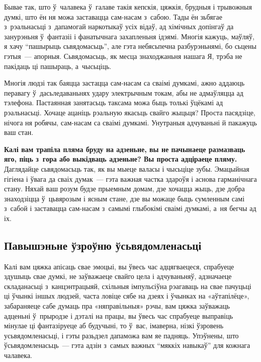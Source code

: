 Бывае так, што ў~чалавека ў~галаве такія кепскія, цяжкія, брудныя і трывожныя думкі, што ён ня можа заставацца сам-насам з~сабою. Тады ён зьбягае з~рэальнасьці з~дапамогай наркотыкаў усіх відаў, ад хімічных допінгаў да занурэньня ў~фантазіі і фанатычнага захапленьня ідэямі. Многія кажуць, маўляў, я хачу ``пашырыць сьвядомасьць'', але гэта небясьпечна разбурэньнямі, бо сьцены гэтыя~--- апорныя. Сьвядомасьць, як месца знаходжаньня нашага Я, трэба не пакідаць ці пашыраць, а~чысьціць.

Многія людзі так баяцца застацца сам-насам са сваімі думкамі, ажно аддаюць перавагу ў~дасьледаваньнях удару электрычным токам, абы не адмаўляцца ад тэлефона. Пастаянная занятасьць таксама можа быць толькі ўцёкамі ад рэальнасьці. Хочаце ацаніць рэальную якасьць свайго жыцьця? Проста пасядзіце, нічога ня робячы, сам-насам са сваімі думкамі. Унутраныя адчуваньні й пакажуць ваш стан.

\textbf{Калі вам трапіла пляма бруду на адзеньне, вы не пачынаеце размазваць яго, піць з~гора або выкідваць адзеньне? Вы проста адціраеце пляму.} Даглядайце сьвядомасьць так, як вы мыеце валасы і чысьціце зубы. Эмацыйная гігіена і ўвага да сваіх думак~--- гэта важная частка здароўя і аснова гарманічнага стану. Няхай ваш розум будзе прыемным домам, дзе хочацца жыць, дзе добра знаходзіцца ў~цьвярозым і ясным стане, дзе вы можаце быць сумленным самі з~сабой і заставацца сам-насам з~самымі глыбокімі сваімі думкамі, а~ня бегчы ад іх.

\subsection*{Павышэньне ўзроўню ўсьвядомленасьці}

Калі вам цяжка апісаць свае эмоцыі, вы ўвесь час адцягваецеся, спрабуеце здушыць свае думкі, не заўважаеце свайго цела і адчуваньняў, адзначаеце складанасьці з~канцэнтрацыяй, схільныя імпульсіўна рэагаваць на свае пачуцьці ці ўчынкі іншых людзей, часта ловіце сябе на дзеях і ўчынках на «аўтапілёце», забараняеце сабе думаць пра «няправільныя» рэчы, вам цяжка заўважаць адценьні ў~прыродзе і дэталі на працы, вы ўвесь час спрабуеце выправіць мінулае ці фантазіруеце аб будучыні, то ў~вас, імаверна, нізкі ўзровень усьвядомленасьці, і гэты разьдзел дапаможа вам яе падняць. Упэўнены, што ўсьвядомленасьць~--- гэта адзін з~самых важных ``мяккіх навыкаў'' для кожнага чалавека.


